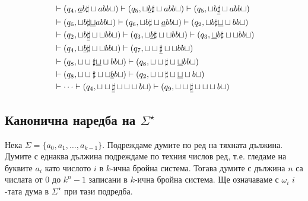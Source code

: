 \begin{extra}
\begin{example}
\begin{align*}
                                           & \vdash (q_4, \underline{a}b\sharp\sqcup abb\sqcup) \vdash (q_5, \sqcup\underline{b}\sharp \sqcup abb\sqcup) \vdash (q_5, \sqcup b\underline{\sharp} \sqcup abb\sqcup)\\
                                           & \vdash (q_6, \sqcup b \sharp \underline{\sqcup} abb\sqcup) \vdash (q_6, \sqcup b \sharp \sqcup \underline{a}bb\sqcup) \vdash (q_2, \sqcup b \sharp \underline{\sqcup}\sqcup bb\sqcup)\\
                                           & \vdash (q_2, \sqcup b \underline{\sharp} \sqcup\sqcup bb\sqcup) \vdash (q_3, \sqcup \underline{b} \sharp \sqcup\sqcup bb\sqcup) \vdash (q_3, \underline{\sqcup} b \sharp \sqcup\sqcup bb\sqcup)\\
                                           & \vdash (q_4,  \sqcup \underline{b} \sharp \sqcup\sqcup bb\sqcup) \vdash (q_7, \sqcup \sqcup \underline{\sharp} \sqcup\sqcup bb\sqcup) \\
                                           & \vdash (q_8, \sqcup \sqcup \sharp \underline{\sqcup}\sqcup bb\sqcup) \vdash (q_8, \sqcup \sqcup \sharp \sqcup \underline{\sqcup} bb\sqcup) \\
                                           & \vdash (q_8, \sqcup \sqcup \sharp \sqcup \sqcup \underline{b}b\sqcup) \vdash (q_2, \sqcup \sqcup \sharp \sqcup \underline{\sqcup} \sqcup b\sqcup)\\
                                           & \vdash \cdots \vdash (q_4, \sqcup\sqcup\underline{\sharp}\sqcup\sqcup\sqcup b\sqcup) \vdash (q_9, \sqcup\sqcup\underline{\sharp}\sqcup\sqcup\sqcup b\sqcup)
  \end{align*}
\end{example}
\end{extra}

\subsection*{Канонична наредба на $\Sigma^\star$}

Нека $\Sigma = \{a_0,a_1,\dots,a_{k-1}\}$.
Подреждаме думите по ред на тяхната дължина.
Думите с еднаква дължина подреждаме по техния числов ред, т.е.
гледаме на буквите $a_i$ като числото $i$ в $k$-ична бройна система.
Тогава думите с дължина $n$ са числата от $0$ до $k^n-1$ записани в $k$-ична бройна система.
Ще означаваме с $\omega_i$ $i$-тата дума в $\Sigma^\star$ при тази подредба.

